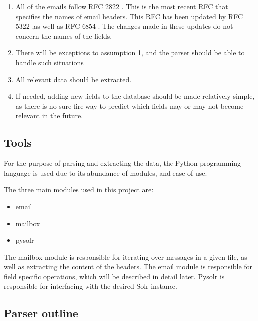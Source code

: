 \documentclass[a4paper,english]{report}
\begin{document}
\begin{enumerate}

\item All of the emails follow RFC 2822 \cite{RFC2822}. This is the most recent RFC that specifies the names of email headers. This RFC has been updated by RFC 5322  \cite{RFC5322},as well as RFC 6854 \cite{RFC6854}. The changes made in these updates do not concern the names of the fields.
\item  There will be exceptions to assumption 1, and the parser should be able to handle such situations
\item All relevant data should be extracted.
\item If needed, adding new fields to the database should be made relatively simple, as there is no sure-fire way to predict which fields may or may not become relevant in the future. 
\end{enumerate}





\subsection{Tools}

For the purpose of parsing and extracting the data, the Python programming language is used due to its abundance of modules, and ease of use.

The three main modules used in this project are: 

\begin{itemize}
	\item email 
	\item mailbox 
	\item pysolr 
\end{itemize}
The mailbox module is responsible for iterating over messages in a given file, as well as extracting the content of the headers. The email module is responsible for field specific operations, which will be described in detail later.
Pysolr is responsible for interfacing with the desired Solr instance.

\subsection{Parser outline}
\end{document}
